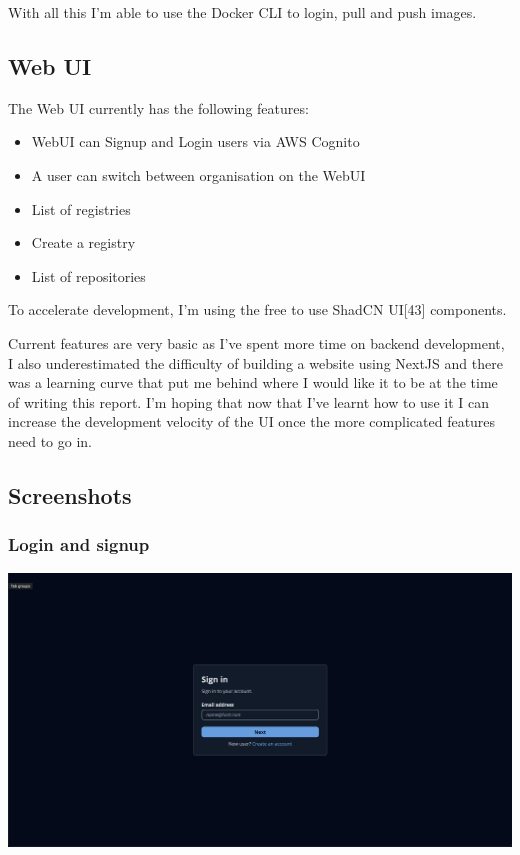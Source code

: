 \documentclass{article}
\begin{document}
  With all this I'm able to use the Docker CLI to login, pull and push images.

  \subsection{Web UI}

  The Web UI currently has the following features:
  \begin{itemize}
    \item WebUI can Signup and Login users via AWS Cognito
    \item A user can switch between organisation on the WebUI
    \item List of registries
    \item Create a registry
    \item List of repositories
  \end{itemize}

  To accelerate development, I'm using the free to use ShadCN UI[43] components.

  Current features are very basic as I've spent more time on backend development, I also underestimated the difficulty of building a website using NextJS and there was a learning curve that put me behind where I would like it to be at the time of writing this report. I'm hoping that now that I've learnt how to use it I can increase the development velocity of the UI once the more complicated features need to go in.

  \subsection{Screenshots}

  \subsubsection{Login and signup}

  \includegraphics[scale=0.28]{screenshots/signin.png}
\end{document}
